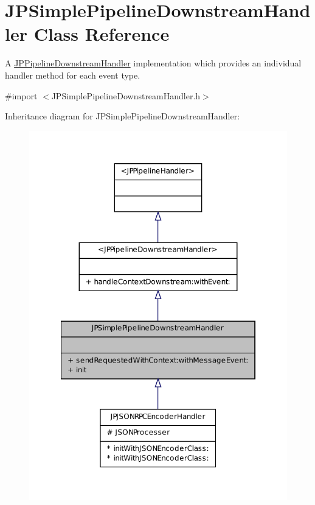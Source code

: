 \hypertarget{a00037}{
\section{JPSimplePipelineDownstreamHandler Class Reference}
\label{a00037}
}


A \hyperlink{a00021}{JPPipelineDownstreamHandler} implementation which provides an individual handler method for each event type.  




{\ttfamily \#import $<$JPSimplePipelineDownstreamHandler.h$>$}



Inheritance diagram for JPSimplePipelineDownstreamHandler:\nopagebreak
\begin{figure}[H]
\begin{center}
\leavevmode
\includegraphics[width=322pt]{a00158}
\end{center}
\end{figure}


